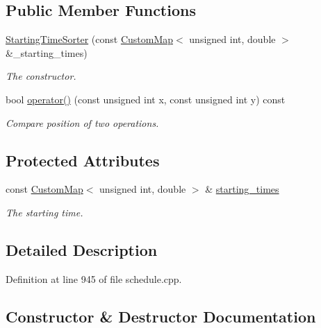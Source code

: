 \subsection*{Public Member Functions}
\begin{DoxyCompactItemize}
\item 
\hyperlink{classStartingTimeSorter_a0dcd391172cbcfcb87e145edf9967469}{Starting\+Time\+Sorter} (const \hyperlink{custom__map_8hpp_a18ca01763abbe3e5623223bfe5aaac6b}{Custom\+Map}$<$ unsigned int, double $>$ \&\+\_\+starting\+\_\+times)
\begin{DoxyCompactList}\small\item\em The constructor. \end{DoxyCompactList}\item 
bool \hyperlink{classStartingTimeSorter_aede3b73bfb8a76fda1d6f77a328500b1}{operator()} (const unsigned int x, const unsigned int y) const
\begin{DoxyCompactList}\small\item\em Compare position of two operations. \end{DoxyCompactList}\end{DoxyCompactItemize}
\subsection*{Protected Attributes}
\begin{DoxyCompactItemize}
\item 
const \hyperlink{custom__map_8hpp_a18ca01763abbe3e5623223bfe5aaac6b}{Custom\+Map}$<$ unsigned int, double $>$ \& \hyperlink{classStartingTimeSorter_a0eea213355a6758cbc2f153c5b9f593c}{starting\+\_\+times}
\begin{DoxyCompactList}\small\item\em The starting time. \end{DoxyCompactList}\end{DoxyCompactItemize}


\subsection{Detailed Description}


Definition at line 945 of file schedule.\+cpp.



\subsection{Constructor \& Destructor Documentation}
\mbox{\label{classStartingTimeSorter_a0dcd391172cbcfcb87e145edf9967469}} 
